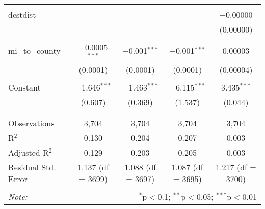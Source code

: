\begin{table}[!htbp]
\begin{tabular}{@{\extracolsep{5pt}}lcccc}
  & & & & \\ 
 destdist &  &  &  & $-$0.00000 \\ 
  &  &  &  & (0.00000) \\ 
  & & & & \\ 
 mi\_to\_county & $-$0.0005$^{***}$ & $-$0.001$^{***}$ & $-$0.001$^{***}$ & 0.00003 \\ 
  & (0.0001) & (0.0001) & (0.0001) & (0.00004) \\ 
  & & & & \\ 
 Constant & $-$1.646$^{***}$ & $-$1.463$^{***}$ & $-$6.115$^{***}$ & 3.435$^{***}$ \\ 
  & (0.607) & (0.369) & (1.537) & (0.044) \\ 
  & & & & \\ 
\hline \\[-1.8ex] 
Observations & 3,704 & 3,704 & 3,704 & 3,704 \\ 
R$^{2}$ & 0.130 & 0.204 & 0.207 & 0.003 \\ 
Adjusted R$^{2}$ & 0.129 & 0.203 & 0.205 & 0.003 \\ 
Residual Std. Error & 1.137 (df = 3699) & 1.088 (df = 3697) & 1.087 (df = 3695) & 1.217 (df = 3700) \\ 
\hline 
\hline \\[-1.8ex] 
\textit{Note:}  & \multicolumn{4}{r}{$^{*}$p$<$0.1; $^{**}$p$<$0.05; $^{***}$p$<$0.01} \\ 
\end{tabular} 
\end{table} 
